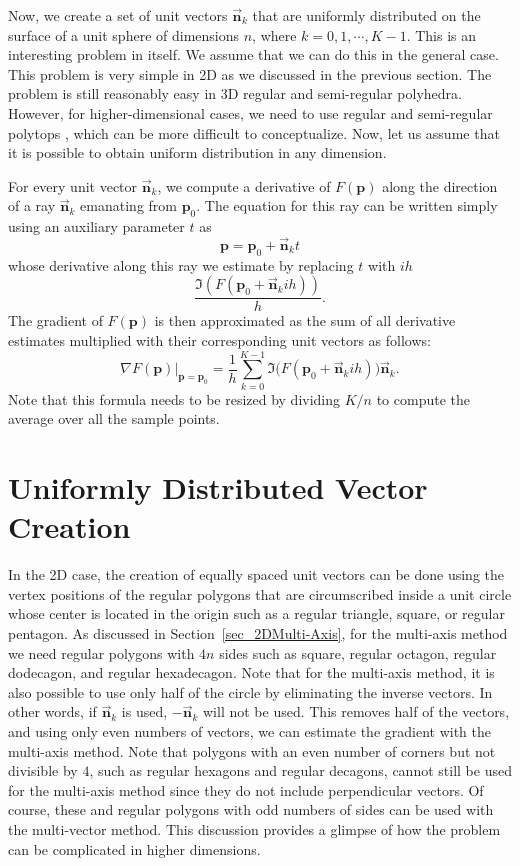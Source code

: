 \documentclass{article}
\begin{document}
Now, we create a set of unit vectors $\vec{\mathbf{n}}_k$ that are uniformly distributed on the surface of a unit sphere of dimensions $n$, where $k=0,1,\cdots, K-1$.  This is an interesting problem in itself.  We assume that we can do this in the general case.  This problem is very simple in 2D as we discussed in the previous section. The problem is still reasonably easy in 3D regular and semi-regular polyhedra.  However, for higher-dimensional cases, we need to use regular and semi-regular polytops \cite{coxeter1973regular,coxeter1985regular}, which can be more difficult to conceptualize. Now, let us assume that it is possible to obtain uniform distribution in any dimension. 

For every unit vector $\vec{\mathbf{n}}_k$, we compute a derivative of $F(\mathbf{p})$ along the direction of a ray $\vec{\mathbf{n}}_k$ emanating from $\mathbf{p}_0$.  The equation for this ray can be written simply using an auxiliary parameter $t$ as 
$$\mathbf{p} = \mathbf{p}_0 + \vec{\mathbf{n}}_k t $$
whose derivative along this ray we estimate by replacing $t$ with $i h$ \cite{almohy2010,squire1998}  
$$\frac{ \Im ( F (\mathbf{p}_0 + \vec{\mathbf{n}}_k i h ))}{h} . $$
The gradient of $F(\mathbf{p})$ is then approximated as the sum of all derivative estimates multiplied with their corresponding unit vectors as follows: 
$$ \nabla F(\mathbf{p})|_{\mathbf{p}=\mathbf{p}_0} = \frac{1}{h} \sum_{k=0}^{K-1} \Im \bigl( F (\mathbf{p}_0 + \vec{\mathbf{n}}_k i h ) \bigr) \vec{\mathbf{n}}_k . $$
Note that this formula needs to be resized by dividing $K/n$ to compute the average over all the sample points. 

\section{Uniformly Distributed Vector Creation}

In the 2D case, the creation of equally spaced unit vectors can be done using the vertex positions of the regular polygons that are circumscribed inside a unit circle whose center is located in the origin such as a regular triangle, square, or regular pentagon. As discussed in Section~\ref{sec_2DMulti-Axis}, for the multi-axis method we need regular polygons with $4n$ sides such as square, regular octagon, regular dodecagon, and regular hexadecagon. Note that for the multi-axis method, it is also possible to use only half of the circle by eliminating the inverse vectors. In other words, if $\vec{\mathbf{n}}_k$ is used, $-\vec{\mathbf{n}}_k$ will not be used. This removes half of the vectors, and using only even numbers of vectors, we can estimate the gradient with the multi-axis method. 
Note that polygons with an even number of corners but not divisible by $4$, such as regular hexagons and regular decagons, cannot still be used for the multi-axis method since they do not include perpendicular vectors. Of course, these and regular polygons with odd numbers of sides can be used with the multi-vector method. This discussion provides a glimpse of how the problem can be complicated in higher dimensions.  
\end{document}
